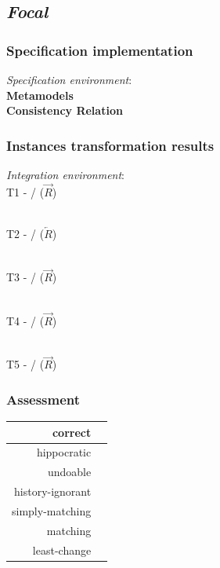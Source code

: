 \documentclass{article}
\begin{document}
\pagebreak
\subsection{\textit{Focal}}
\subsubsection{Specification implementation}
\textit{Specification environment}:
~\\

\textbf{Metamodels}
~\\

\textbf{Consistency Relation}
\subsubsection{Instances transformation results}
\textit{Integration environment}:
~\\

T1 -  /  ($\overrightarrow{R}$)

~\\

T2 -  /  ($\overleftarrow{R}$)

~\\

T3 -  /  ($\overrightarrow{R}$)

~\\

T4 -  /  ($\overrightarrow{R}$)

~\\

T5 -  /  ($\overrightarrow{R}$)

\subsubsection{Assessment}

\begin{center}
\begin{tabular}{| r | c |}
  \hline                        
  correct & \\
  \hline
  hippocratic & \\
  \hline 
  undoable & \\
  \hline 
  history-ignorant & \\
  \hline 
  simply-matching & \\
  \hline 
  matching & \\
  \hline 
  least-change & \\
  \hline   
\end{tabular}
\end{center}
\pagebreak
\end{document}
